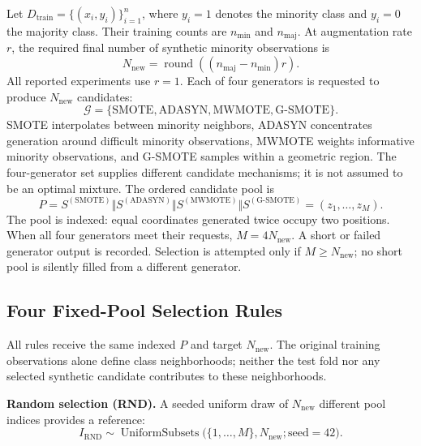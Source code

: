 \documentclass[pdflatex]{sn-jnl}
\begin{document}
Let \(D_{\mathrm{train}}=\{(x_i,y_i)\}_{i=1}^{n}\), where \(y_i=1\) denotes the minority class and \(y_i=0\) the majority class. Their training counts are \(n_{\min}\) and \(n_{\mathrm{maj}}\). At augmentation rate \(r\), the required final number of synthetic minority observations is
\begin{equation}\label{eq:1}
N_{\mathrm{new}}=\operatorname{round}\!\left((n_{\mathrm{maj}}-n_{\min})r\right).
\end{equation}
All reported experiments use \(r=1\). Each of four generators is requested to produce \(N_{\mathrm{new}}\) candidates:
\begin{equation}\label{eq:2}
\mathcal{G}=\{\mathrm{SMOTE},\mathrm{ADASYN},\mathrm{MWMOTE},\mathrm{G\mbox{-}SMOTE}\}.
\end{equation}
SMOTE interpolates between minority neighbors, ADASYN concentrates generation around difficult minority observations, MWMOTE weights informative minority observations, and G-SMOTE samples within a geometric region. The four-generator set supplies different candidate mechanisms; it is not assumed to be an optimal mixture. The ordered candidate pool is
\begin{equation}\label{eq:3}
P=S^{(\mathrm{SMOTE})}\Vert S^{(\mathrm{ADASYN})}\Vert
S^{(\mathrm{MWMOTE})}\Vert S^{(\mathrm{G\mbox{-}SMOTE})}
=(z_1,\ldots,z_M).
\end{equation}
The pool is indexed: equal coordinates generated twice occupy two positions. When all four generators meet their requests, \(M=4N_{\mathrm{new}}\). A short or failed generator output is recorded. Selection is attempted only if \(M\geq N_{\mathrm{new}}\); no short pool is silently filled from a different generator.

\subsection{Four Fixed-Pool Selection Rules}

All rules receive the same indexed \(P\) and target \(N_{\mathrm{new}}\). The original training observations alone define class neighborhoods; neither the test fold nor any selected synthetic candidate contributes to these neighborhoods.

\textbf{Random selection (RND).} A seeded uniform draw of \(N_{\mathrm{new}}\) different pool indices provides a reference:
\begin{equation}\label{eq:4}
I_{\mathrm{RND}}\sim\operatorname{UniformSubsets}
\bigl(\{1,\ldots,M\},N_{\mathrm{new}};\mathrm{seed}=42\bigr).
\end{equation}
\end{document}
